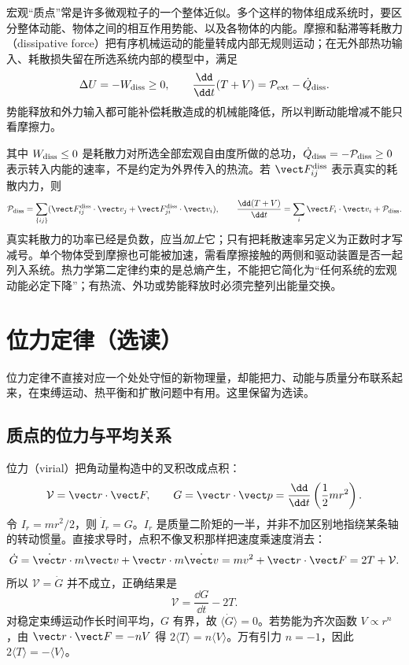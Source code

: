 宏观“质点”常是许多微观粒子的一个整体近似。多个这样的物体组成系统时，要区分整体动能、物体之间的相互作用势能、以及各物体的内能。摩擦和黏滞等耗散力（dissipative force）把有序机械运动的能量转成内部无规则运动；在无外部热功输入、耗散损失留在所选系统内部的模型中，满足
\begin{equation}
 \Delta U=-W_{\rm diss}\ge0,\qquad
 \frac{\dd}{\dd t}(T+V)=\mathcal P_{\rm ext}-\dot Q_{\rm diss}.
 \label{r2ch02:eq:020}
\end{equation}
势能释放和外力输入都可能补偿耗散造成的机械能降低，所以判断动能增减不能只看摩擦力。

其中 $W_{\rm diss}\le0$ 是耗散力对所选全部宏观自由度所做的总功，$\dot Q_{\rm diss}=-\mathcal P_{\rm diss}\ge0$ 表示转入内能的速率，不是约定为外界传入的热流。若 $\vect F_{ij}^{\rm diss}$ 表示真实的耗散内力，则
\[
 \mathcal P_{\rm diss}
 =\sum_{\{ij\}}(\vect F_{ij}^{\rm diss}\cdot\vect v_j
                 +\vect F_{ji}^{\rm diss}\cdot\vect v_i),\qquad
 \frac{\dd(T+V)}{\dd t}=\sum_i\vect F_i\cdot\vect v_i+\mathcal P_{\rm diss}.
\]
真实耗散力的功率已经是负数，应当\emph{加上}它；只有把耗散速率另定义为正数时才写减号。单个物体受到摩擦也可能被加速，需看摩擦接触的两侧和驱动装置是否一起列入系统。热力学第二定律约束的是总熵产生，不能把它简化为“任何系统的宏观动能必定下降”；有热流、外功或势能释放时必须完整列出能量交换。

\section{位力定律（选读）}
\label{r2ch02:sec:virial}

位力定律不直接对应一个处处守恒的新物理量，却能把力、动能与质量分布联系起来，在束缚运动、热平衡和扩散问题中有用。这里保留为选读。

\subsection{质点的位力与平均关系}
\label{r2ch02:sec:point-virial}

位力（virial）把角动量构造中的叉积改成点积：
\begin{equation}
 \mathcal V=\vect r\cdot\vect F,\qquad
 G=\vect r\cdot\vect p=\frac{\dd}{\dd t}\left(\frac12mr^2\right).
 \label{r2ch02:eq:021}
\end{equation}
令 $I_r=mr^2/2$，则 $\dot I_r=G$。$I_r$ 是质量二阶矩的一半，并非不加区别地指绕某条轴的转动惯量。直接求导时，点积不像叉积那样把速度乘速度消去：
\[
 \dot G=\dot{\vect r}\cdot m\vect v+\vect r\cdot m\dot{\vect v}
       =mv^2+\vect r\cdot\vect F=2T+\mathcal V.
\]
所以 $\mathcal V=\dot G$ 并不成立，正确结果是
\begin{equation}
 \boxed{\mathcal V=\frac{\dd G}{\dd t}-2T}.
 \label{r2ch02:eq:022}
\end{equation}
对稳定束缚运动作长时间平均，$G$ 有界，故 $\langle\dot G\rangle=0$。若势能为齐次函数 $V\propto r^n$，由 $\vect r\cdot\vect F=-nV$ 得 $2\langle T\rangle=n\langle V\rangle$。万有引力 $n=-1$，因此 $2\langle T\rangle=-\langle V\rangle$。


